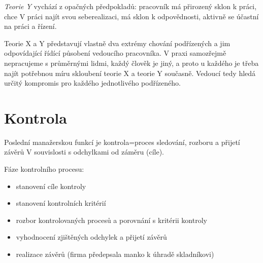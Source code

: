 \emph{Teorie Y} vychází z opačných předpokladů: pracovník má přirozený sklon k práci, chce V práci najít svou seberealizaci, má sklon k odpovědnosti, aktivně se účastní na práci a řízení.

Teorie X a Y představují vlastně dva extrémy chování podřízených a jim odpovídající řídící působení vedoucího pracovníka. V praxi samozřejmě nepracujeme s průměrnými lidmi, každý člověk je jiný, a proto u každého je třeba najít potřebnou míru skloubení teorie X a teorie Y současně. Vedoucí tedy hledá určitý kompromis pro každého jednotlivého podřízeného.

\section*{Kontrola}
Poslední manažerskou funkcí je kontrola=proces sledování, rozboru a přijetí závěrů V souvislosti s odchylkami od záměru (cíle).

Fáze kontrolního procesu:
\begin{itemize}
    \item stanovení cíle kontroly
    \item stanovení kontrolních kritérií
    \item rozbor kontrolovaných procesů a porovnání s kritérii kontroly
    \item vyhodnocení zjištěných odchylek a přijetí závěrů
    \item realizace závěrů (firma předepsala manko k úhradě skladníkovi)
\end{itemize}
